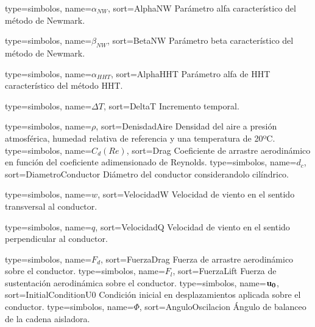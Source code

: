 {
	type={simbolos},
	name={$\alpha_{NW}$}, %
	sort={AlphaNW} %
}
{Parámetro alfa característico del método de Newmark.}

{
	type={simbolos},
	name={$\beta_{NW}$}, %
	sort={BetaNW} %
}
{Parámetro beta característico del método de Newmark.}

{
	type={simbolos},
	name={$\alpha_{HHT}$}, %
	sort={AlphaHHT} %
}
{Parámetro alfa de HHT característico del método HHT.}

{
	type={simbolos},
	name={$\Delta T$}, %
	sort={DeltaT} %
}
{Incremento temporal.}

{
	type={simbolos},
	name={$\rho$}, %
	sort={DenisdadAire} %
}
{Densidad del aire a presión atmosférica, humedad relativa de referencia y una temperatura de 20ºC.}
{
	type={simbolos},
	name={$C_d(Re)$}, %
	sort={Drag} %
}
{Coeficiente de arrastre aerodinámico en función del coeficiente adimensionado de Reynolds.}
{
	type={simbolos},
	name={$d_c$}, %
	sort={DiametroConductor} %
}
{Diámetro del conductor considerandolo cilíndrico.}

{
	type={simbolos},
	name={$w$}, %
	sort={VelocidadW} %
}
{Velocidad de viento en el sentido transversal al conductor.}

{
	type={simbolos},
	name={$q$}, %
	sort={VelocidadQ} %
}
{Velocidad de viento en el sentido perpendicular al conductor.}

{
	type={simbolos},
	name={$F_d$}, %
	sort={FuerzaDrag} %
}
{Fuerza de arrastre aerodinámico sobre el conductor.}
{
	type={simbolos},
	name={$F_l$}, %
	sort={FuerzaLift} %
}
{Fuerza de sustentación aerodinámica sobre el conductor.}
{
	type={simbolos},
	name={$\bf{u}_0$}, %
	sort={InitialConditionU0} %
}
{Condición inicial en desplazamientos aplicada sobre el conductor.}
{
	type={simbolos},
	name={$\Phi$}, %
	sort={AnguloOscilacion} %
}
{Ángulo de balanceo de la cadena aisladora.}
